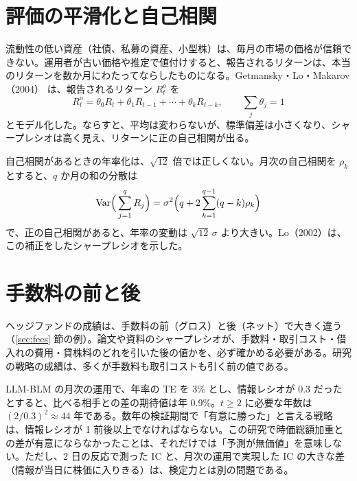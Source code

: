 \section{評価の平滑化と自己相関}
\label{sec:smoothing}

流動性の低い資産（社債、私募の資産、小型株）は、毎月の市場の価格が信頼できない。運用者が古い価格や推定で値付けすると、報告されるリターンは、本当のリターンを数か月にわたってならしたものになる。Getmansky・Lo・Makarov（2004）\cite{glm2004} は、報告されるリターン $R^o_t$ を
\begin{equation}
R^o_t = \theta_0 R_t + \theta_1 R_{t-1} + \cdots + \theta_k R_{t-k}, \qquad \textstyle\sum_j \theta_j = 1
\end{equation}
とモデル化した。ならすと、平均は変わらないが、標準偏差は小さくなり、シャープレシオは高く見え、リターンに正の自己相関が出る。

自己相関があるときの年率化は、$\sqrt{12}$ 倍では正しくない。月次の自己相関を $\rho_k$ とすると、$q$ か月の和の分散は
\begin{equation}
\mathrm{Var}\Big(\sum_{j=1}^{q} R_j\Big) = \sigma^2\Big(q + 2\sum_{k=1}^{q-1}(q-k)\rho_k\Big)
\end{equation}
で、正の自己相関があると、年率の変動は $\sqrt{12}\,\sigma$ より大きい。Lo（2002）は、この補正をしたシャープレシオを示した。

\section{手数料の前と後}

ヘッジファンドの成績は、手数料の前（グロス）と後（ネット）で大きく違う（\ref{sec:fees} 節の例）。論文や資料のシャープレシオが、手数料・取引コスト・借入れの費用・貸株料のどれを引いた後の値かを、必ず確かめる必要がある。研究の戦略の成績は、多くが手数料も取引コストも引く前の値である。

\begin{projbox}
LLM-BLM の月次の運用で、年率の TE を 3\% とし、情報レシオが 0.3 だったとすると、比べる相手との差の期待値は年 0.9\%。$t \geq 2$ に必要な年数は $(2/0.3)^2 \approx 44$ 年である。数年の検証期間で「有意に勝った」と言える戦略は、情報レシオが 1 前後以上でなければならない。この研究で時価総額加重との差が有意にならなかったことは、それだけでは「予測が無価値」を意味しない。ただし、2 日の反応で測った IC と、月次の運用で実現した IC の大きな差（情報が当日に株価に入りきる）は、検定力とは別の問題である。
\end{projbox}
